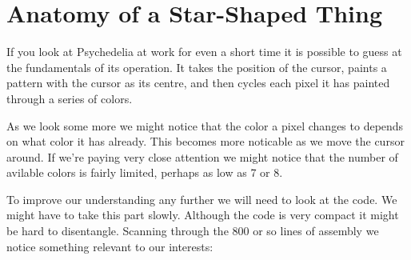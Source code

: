 \chapter{Anatomy of a Star-Shaped Thing} 
\label{sec:listing_pattern}
\lstset{style=6502Style}

If you look at Psychedelia at work for even a short time it is possible to guess at the fundamentals
of its operation. It takes the position of the cursor, paints a pattern with the cursor as its centre,
and then cycles each pixel it has painted through a series of colors.

As we look some more we might notice that the color a pixel changes to depends on what color it has already.
This becomes more noticable as we move the cursor around. If we're paying very close attention we might notice
that the number of avilable colors is fairly limited, perhaps as low as 7 or 8.

To improve our understanding any further we will need to look at the code. We might have to take this part slowly.
Although the code is very compact it might be hard to disentangle. Scanning through the 800 or so lines of assembly
we notice something relevant to our interests:

